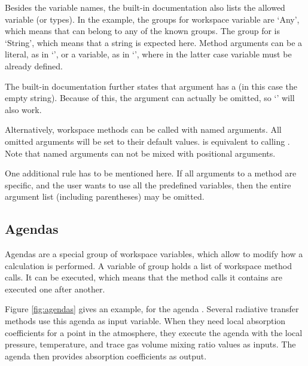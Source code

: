 Besides the variable names, the built-in documentation also lists the allowed
variable  (or types). In the example, the groups for workspace variable
 are `Any', which means that  can belong to any of the
known groups. The group for  is `String', which means that a
string is expected here. Method arguments can be a literal, as in
`', or a variable, as in
`', where in the latter case variable
 must be already defined.

The built-in documentation further states that argument
 has a  (in this case the
empty string). Because of this, the argument can actually be omitted,
so `' will also work.

Alternatively, workspace methods can be called with named arguments. All omitted
arguments will be set to their default values.  is
equivalent to calling . Note that
named arguments can not be mixed with positional arguments.

One additional rule has to be mentioned here. If all arguments to a
method are specific, and the user wants to use all the predefined
variables, then the entire argument list (including parentheses) may
be omitted. 


\subsection{Agendas}
\label{sec:agendas}
%
Agendas are a special group of workspace variables, which allow to
modify how a calculation is performed. A variable of group
 holds a list of workspace method calls. It can be
executed, which means that the method calls it contains are executed one
after another.

Figure \ref{fig:agendas} gives an example, for the agenda
. Several radiative transfer methods use this
agenda as input variable. When they need local absorption coefficients for a
point in the atmosphere, they execute the agenda with the local pressure,
temperature, and trace gas volume mixing ratio values as inputs. The agenda
then provides absorption coefficients as output.

